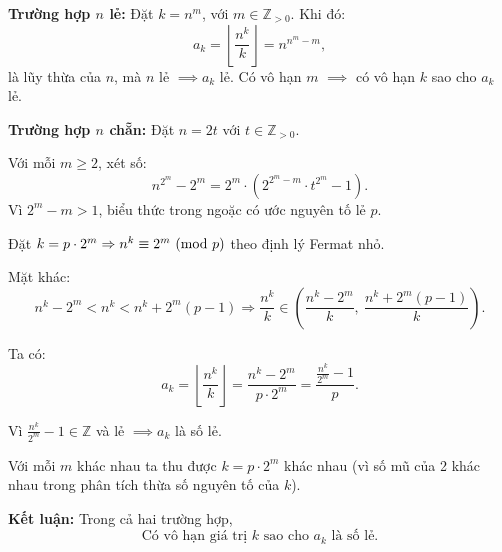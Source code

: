 \documentclass[../05-modular-arithmetic-a.tex]{subfiles}
\begin{document}
\begin{soln}\footnotemark
	\textbf{Trường hợp \( n \) lẻ:} Đặt \( k = n^m \), với \( m \in \mathbb{Z}_{>0} \). Khi đó:
	\[
		a_k = \left\lfloor \frac{n^k}{k} \right\rfloor = n^{n^m - m},
	\]
	là lũy thừa của \( n \), mà \( n \) lẻ \( \implies a_k \) lẻ. Có vô hạn \( m \) \( \implies \) có vô hạn \( k \) sao cho \( a_k \) lẻ.

	\textbf{Trường hợp \( n \) chẵn:} Đặt \( n = 2t \) với \( t \in \mathbb{Z}_{>0} \).

	Với mỗi \( m \ge 2 \), xét số:
	\[
		n^{2^m} - 2^m = 2^m \cdot \left(2^{2^m - m} \cdot t^{2^m} - 1\right).
	\]
	Vì \( 2^m - m > 1 \), biểu thức trong ngoặc có ước nguyên tố lẻ \( p \).

	Đặt \( k = p \cdot 2^m \Rightarrow n^k \equiv 2^m \ (\mathrm{mod}\ p) \) theo định lý Fermat nhỏ.

	Mặt khác:
	\[
		n^k - 2^m < n^k < n^k + 2^m(p - 1)
	\Rightarrow \frac{n^k}{k} \in \left(\frac{n^k - 2^m}{k},\ \frac{n^k + 2^m(p - 1)}{k}\right).
	\]

	Ta có:
	\[
		a_k = \left\lfloor \frac{n^k}{k} \right\rfloor = \frac{n^k - 2^m}{p \cdot 2^m} = \frac{\frac{n^k}{2^m} - 1}{p}.
	\]

	Vì \( \frac{n^k}{2^m} - 1 \in \mathbb{Z} \) và lẻ \( \implies a_k \) là số lẻ.

	Với mỗi \( m \) khác nhau ta thu được \( k = p \cdot 2^m \) khác nhau (vì số mũ của 2 khác nhau trong phân tích thừa số nguyên tố của \( k \)).

	\textbf{Kết luận:} Trong cả hai trường hợp,
	\[
		\boxed{\text{Có vô hạn giá trị } k \text{ sao cho } a_k \text{ là số lẻ.}}
	\]
\end{soln}

\end{document}
